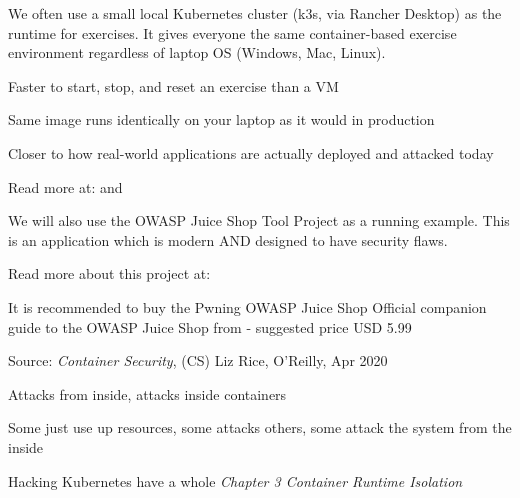 \documentclass[Screen16to9,17pt]{foils}
\begin{document}


We often use a small local Kubernetes cluster (k3s, via Rancher Desktop) as the runtime for exercises. It gives everyone the same container-based exercise environment regardless of laptop OS (Windows, Mac, Linux).

\begin{list2}
  \item Faster to start, stop, and reset an exercise than a VM
  \item Same image runs identically on your laptop as it would in production
  \item Closer to how real-world applications are actually deployed and attacked today
\end{list2}

Read more at:  and 



We will also use the OWASP Juice Shop Tool Project as a running example. This is an application which is modern AND designed to have security flaws.

Read more about this project at: \\ 

It is recommended to buy the Pwning OWASP Juice Shop Official companion guide to the OWASP Juice Shop from  - suggested price USD 5.99




Source: \emph{Container Security}, (CS) Liz Rice, O'Reilly, Apr 2020

\begin{list2}
\item Attacks from inside, attacks inside containers
\item Some just use up resources, some attacks others, some attack the system from the inside
\item Hacking Kubernetes have a whole \emph{Chapter 3 Container Runtime Isolation}
\end{list2}
\end{document}
